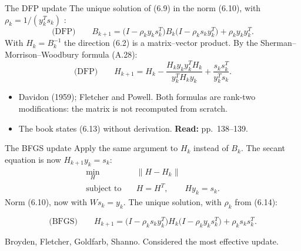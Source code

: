 \documentclass[aspectratio=169,12pt]{beamer}
\newcommand{\eqn}[1]{\text{\small(#1)}}
\newcommand{\readbook}[1]{{\color{red}\textbf{Read:} #1}}
\begin{document}
\begin{frame}{The DFP update}
  The unique solution of (6.9) in the norm (6.10), with $\rho_{k}=1/(y_{k}^{T}s_{k})$ \eqn{6.14}:
  \[
    \text{(DFP)}\qquad
    B_{k+1}=\big(I-\rho_{k}y_{k}s_{k}^{T}\big)B_{k}\big(I-\rho_{k}s_{k}y_{k}^{T}\big)+\rho_{k}y_{k}y_{k}^{T} .
    \tag{6.13}
  \]
  With $H_{k}=B_{k}^{-1}$ the direction (6.2) is a matrix--vector product. By the
  Sherman--Morrison--Woodbury formula (A.28):
  \[
    \text{(DFP)}\qquad
    H_{k+1}=H_{k}-\frac{H_{k}y_{k}y_{k}^{T}H_{k}}{y_{k}^{T}H_{k}y_{k}}+\frac{s_{k}s_{k}^{T}}{y_{k}^{T}s_{k}} .
    \tag{6.15}
  \]

  \begin{itemize}\setlength\itemsep{0.3em}
    \item Davidon (1959); Fletcher and Powell. Both formulas are \alert{rank-two} modifications:
      the matrix is not recomputed from scratch.
    \item The book states (6.13) without derivation. \readbook{pp.~138--139.}
  \end{itemize}
\end{frame}

\begin{frame}{The BFGS update}
  Apply the same argument to $H_{k}$ instead of $B_{k}$. The secant equation is now
  $H_{k+1}y_{k}=s_{k}$:
  \begin{align}
    \min_{H}\quad & \|H-H_{k}\| \tag{6.16a}\\
    \text{subject to}\quad & H=H^{T},\qquad Hy_{k}=s_{k} . \tag{6.16b}
  \end{align}
  Norm (6.10), now with $Ws_{k}=y_{k}$. The unique solution, with $\rho_{k}$ from (6.14):

  \begin{block}{}
    \[
      \text{(BFGS)}\qquad
      H_{k+1}=\big(I-\rho_{k}s_{k}y_{k}^{T}\big)H_{k}\big(I-\rho_{k}y_{k}s_{k}^{T}\big)+\rho_{k}s_{k}s_{k}^{T} .
      \tag{6.17}
    \]
  \end{block}

  Broyden, Fletcher, Goldfarb, Shanno. Considered the most effective update.
\end{frame}
\end{document}
